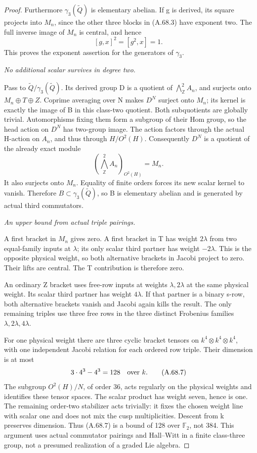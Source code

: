 \begin{proof}
Furthermore \(\gamma_3(\widetilde Q)\) is elementary abelian.
If g is derived, its square projects into \(M_n\), since the
other three blocks in (A.68.3) have exponent two. The full inverse
image of \(M_n\) is central, and hence
\[
 [g,x]^2=[g^2,x]=1.
 \tag{A.68.5}
\]
This proves the exponent assertion for the generators of
\(\gamma_3\).

\emph{No additional scalar survives in degree two.}\par
Pass to \(\widetilde Q/\gamma_3(\widetilde Q)\).
Its derived group D is a quotient of
\(\bigwedge^2_{\mathbb Z}A_n\), and surjects onto
\(M_n\oplus T\oplus Z\). Coprime averaging over N makes
\(D^N\) surject onto \(M_n\); its kernel is exactly the image
of B in this class-two quotient. Both subquotients are globally
trivial. Automorphisms fixing them form a subgroup of their Hom
group, so the head action on \(D^N\) has two-group image.
The action factors through the actual H-action on \(A_n\),
and thus through \(H/O^2(H)\). Consequently \(D^N\) is a
quotient of the already exact module
\[
 \left(\bigwedge^2_{\mathbb Z}A_n\right)_{O^2(H)}=M_n.
 \tag{A.68.6}
\]
It also surjects onto \(M_n\). Equality of finite orders forces
its new scalar kernel to vanish. Therefore
\(B\subset\gamma_3(\widetilde Q)\), so B is elementary
abelian and is generated by actual third commutators.

\emph{An upper bound from actual triple pairings.}\par
A first bracket in \(M_n\) gives zero. A first bracket in T
has weight \(2\lambda\) from two equal-family inputs at
\(\lambda\); its only scalar third partner has weight
\(-2\lambda\). This is the opposite physical weight, so both
alternative brackets in Jacobi project to zero. Their lifts are
central. The T contribution is therefore zero.

An ordinary Z bracket uses free-row inputs at weights
\(\lambda,2\lambda\) at the same physical weight. Its scalar
third partner has weight \(4\lambda\). If that partner is a
binary s-row, both alternative brackets vanish and Jacobi again
kills the result. The only remaining triples use three free rows
in the three distinct Frobenius families
\(\lambda,2\lambda,4\lambda\).

For one physical weight there are three cyclic bracket tensors
on \(k^4\otimes k^4\otimes k^4\), with one independent Jacobi
relation for each ordered row triple. Their dimension is at most
\[
 3\cdot4^3-4^3=128
 \quad\hbox{over }k.
 \tag{A.68.7}
\]
The subgroup \(O^2(H)/N\), of order 36, acts regularly on the
physical weights and identifies these tensor spaces. The scalar
product has weight seven, hence is one. The remaining order-two
stabilizer acts trivially: it fixes the chosen weight line with
scalar one and does not mix the cusp multiplicities. Descent from
k preserves dimension. Thus (A.68.7) is a bound of 128 over
\(\mathbb F_2\), not 384. This argument uses actual commutator
pairings and Hall--Witt in a finite class-three group, not a
presumed realization of a graded Lie algebra.


\end{proof}
